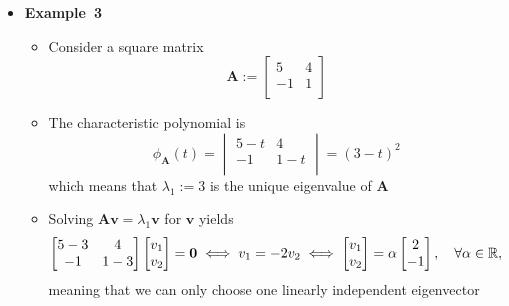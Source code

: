 \documentclass[12pt,a4paper]{article}
\begin{document}
\begin{itemize}
\clearpage
\item \textbf{Example~3}
  \begin{itemize}
  \item Consider a square matrix
    \begin{equation}\nonumber%
      \bm{A} :=
      \begin{bmatrix}
        5 & 4 \\
        -1 & 1 \\
      \end{bmatrix}
    \end{equation}
  \item The characteristic polynomial is
    \begin{equation}\nonumber%
      \phi_{\bm{A}}(t) =
      \begin{vmatrix}
        5-t & 4 \\
        -1 & 1-t \\
      \end{vmatrix}
      =
      (3-t)^{2}
    \end{equation}
    which means that
    $\lambda_{1}:=3$
    is the unique eigenvalue of $\bm{A}$
  \item Solving $\bm{A}\bm{v}=\lambda_{1}\bm{v}$ for $\bm{v}$ yields
    \begin{equation}\nonumber%
      \begin{bmatrix}
        5-3 & 4 \\
        -1 & 1-3 \\
      \end{bmatrix}
      \begin{bmatrix}
        v_{1} \\
        v_{2} \\
      \end{bmatrix}
      = \bm{0}
      \iff
      v_{1} = -2v_{2}
      \iff
      \begin{bmatrix}
        v_{1} \\
        v_{2} \\
      \end{bmatrix}
      =
      \alpha
      \begin{bmatrix}
        2 \\
        -1 \\
      \end{bmatrix},
      \quad \forall \alpha \in \R,
    \end{equation}
    meaning that 
    we can only choose one linearly independent eigenvector


\end{itemize}
\end{itemize}
\end{document}
